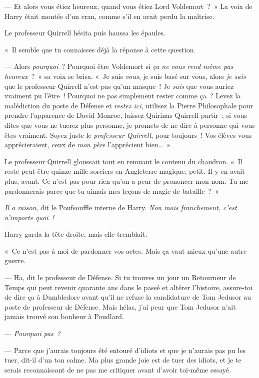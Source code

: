 --- Et alors vous étiez heureux, quand vous étiez Lord Voldemort~?~» La voix de Harry était montée d'un cran, comme s'il en avait perdu la maîtrise.

Le professeur Quirrell hésita puis haussa les épaules.

«~Il semble que tu connaisses déjà la réponse à cette question.

--- Alors \emph{pourquoi}~? Pourquoi être Voldemort si \emph{ça ne vous rend même pas heureux}~?~» sa voix se brisa. «~Je suis \emph{vous}, je suis basé sur vous, alors \emph{je sais} que le professeur Quirrell n'est pas qu'un masque~! Je \emph{sais} que vous auriez vraiment pu l'être~! Pourquoi ne pas simplement rester comme ça~? Levez la malédiction du poste de Défense et \emph{restez ici}, utilisez la Pierre Philosophale pour prendre l'apparence de David Monroe, laissez Quirinus Quirrell partir~; si vous dites que vous ne tuerez plus personne, je promets de ne dire à personne qui vous êtes vraiment. Soyez juste le \emph{professeur Quirrell}, pour toujours~! Vos élèves vous apprécieraient, ceux de \emph{mon père} l'apprécient bien…~»

Le professeur Quirrell gloussait tout en remuant le contenu du chaudron. «~Il reste peut-être quinze-mille sorciers en Angleterre magique, petit. Il y en avait plus, avant. Ce n'est pas pour rien qu'on a peur de prononcer mon nom. Tu me pardonnerais parce que tu aimais mes leçons de magie de bataille~?~»

\emph{Il a raison}, dit le Poufsouffle interne de Harry. \emph{Non mais franchement, c'est n'importe quoi~!}

Harry garda la tête droite, mais elle tremblait.

«~Ce n'est pas à moi de pardonner vos actes. Mais ça vaut mieux qu'une autre guerre.

--- Ha, dit le professeur de Défense. Si tu trouves un jour un Retourneur de Temps qui peut revenir quarante ans dans le passé et altérer l'histoire, assure-toi de dire ça à Dumbledore avant qu'il ne refuse la candidature de Tom Jedusor au poste de professeur de Défense. Mais hélas, j'ai peur que Tom Jedusor n'ait jamais trouvé son bonheur à Poudlard.

--- \emph{Pourquoi pas~?}

--- Parce que j'aurais toujours été entouré d'idiots et que je n'aurais pas pu les tuer, dit-il d'un ton calme. Ma plus grande joie est de tuer des idiots, et je te serais reconnaissant de ne pas me critiquer avant d'avoir toi-même essayé.


